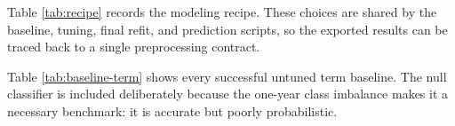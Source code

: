 \documentclass[
  10pt,
]{article}
\begin{document}
Table \ref{tab:recipe} records the modeling recipe. These choices are shared by the baseline, tuning, final refit, and prediction scripts, so the exported results can be traced back to a single preprocessing contract.

\begin{table}[H]
\centering
\caption{\label{tab:appendix-baseline-term}\label{tab:baseline-term} Baseline term models ordered by validation log loss.}
\centering
{}
\end{table}

Table \ref{tab:baseline-term} shows every successful untuned term baseline. The null classifier is included deliberately because the one-year class imbalance makes it a necessary benchmark: it is accurate but poorly probabilistic.
\end{document}
